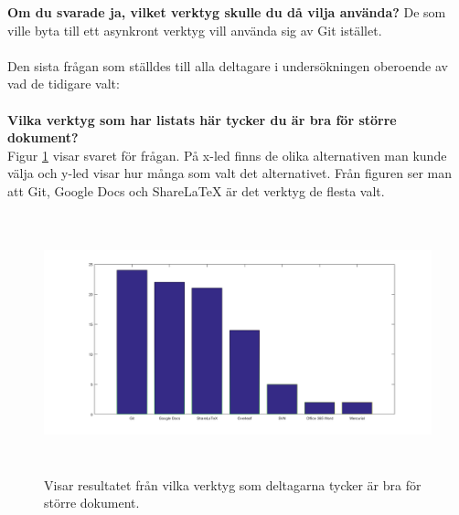 \textbf{Om du svarade ja, vilket verktyg skulle du då vilja använda?}
De som ville byta till ett asynkront verktyg vill använda sig av Git istället.\\\\
Den sista frågan som ställdes till alla deltagare i undersökningen oberoende av vad de tidigare valt:\\\\
\textbf{Vilka verktyg som har listats här tycker du är bra för större dokument?}\\
Figur \ref{fig:best_document_tool} visar svaret för frågan. På x-led finns de olika alternativen man kunde välja och y-led visar hur många som valt det alternativet. Från figuren ser man att Git, Google Docs och ShareLaTeX är det verktyg de flesta valt.

\begin{figure}[H]
	\centering
	\includegraphics[width=150mm,height=75mm]{figures/best_document_tool.png}
	\caption{Visar resultatet från vilka verktyg som deltagarna tycker är bra för större dokument.}
	\label{fig:best_document_tool}
\end{figure}

